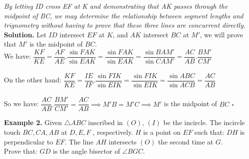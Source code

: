 \documentclass[a4paper,12pt,twoside]{book}
\begin{document}
{\begin{center}
\end{center}
\textit{By letting ID cross EF at K and demonstrating that AK passes through the midpoint of BC, we may determine the relationship between segment lengths and trignometry without having to prove that these three lines are concurrent directly.}\\
\textbf{Solution.} Let $ID$ intersect $EF$ at $K$, and $AK$ intersect $BC$ at $M'$, we will prove that $M'$ is the midpoint of $BC$.\\
We have: $\dfrac{KF}{KE}=\dfrac{AF}{AE}.\dfrac{\sin FAK}{\sin EAK}=\dfrac{\sin FAK}{\sin EAK}=\dfrac{\sin BAM'}{\sin CAM'}=\dfrac{AC}{AB}.\dfrac{BM'}{CM'}$\\\\
On the other hand: $\dfrac{KF}{KE}=\dfrac{IE}{IF}.\dfrac{\sin FIK}{\sin EIK}=\dfrac{\sin FIK}{\sin EIK}=\dfrac{\sin ABC}{\sin ACB}=\dfrac{AC}{AB}$\\\\
So we have: $\dfrac{AC}{AB}.\dfrac{BM'}{CM'}=\dfrac{AC}{AB}\implies M'B=M'C\implies M'$ is the midpoint of $BC$ $\square$
\newpage
\begin{mybox}
\textbf{Example 2.} Given $\triangle{ABC}$ inscribed in $(O)$, $(I)$ be the incircle. The incircle touch $BC, CA,AB$ at $D,E,F$ , respectively. $H$ is a point on $EF$ such that: $DH$ is perpendicular to $EF$. The line $AH$ intersects $(O)$ the second time at $G$.\\Prove that: $GD$ is the angle bisector of $\angle{BGC}$. 
\end{mybox}
\begin{center}


\end{center}}
\end{document}
